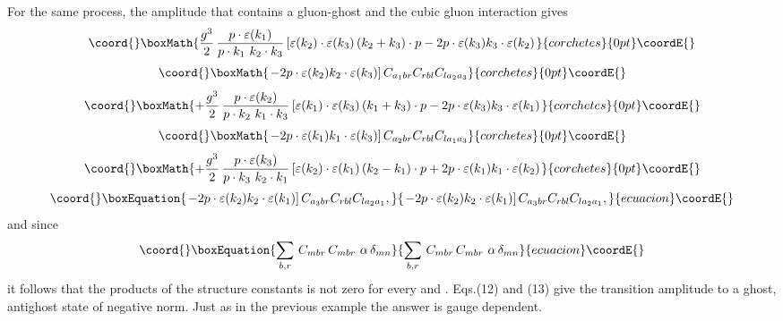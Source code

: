 \documentclass[a4paper,12pt]{article}
\begin{document}
For the same process, the amplitude that contains a gluon-ghost and the cubic gluon interaction gives
\begin{displaymath}\coord{}\boxMath{
\frac{g^{3}}{2} \, \frac{p \cdot \varepsilon(k_{1})}{p \cdot k_{1} \,\, k_{2} \cdot k_{3}} \left[ \varepsilon(k_{2}) \cdot \varepsilon(k_{3}) \, (k_{2} + k_{3}) \cdot p - 2 p \cdot \varepsilon(k_{3}) k_{3} \cdot \varepsilon (k_{2})
\right .
}{corchetes}{0pt}\coordE{}\end{displaymath}
\begin{displaymath}\coord{}\boxMath{
\left .
- 2p \cdot \varepsilon(k_{2}) k_{2} \cdot \varepsilon(k_{3}) \right] C_{a_{1}br} C_{rbl} C_{la_{2}a_{3}}
}{corchetes}{0pt}\coordE{}\end{displaymath}
\begin{displaymath}\coord{}\boxMath{
+ \frac{g^{3}}{2} \, \frac{p \cdot \varepsilon(k_{2})}{p \cdot k_{2} \,\, k_{1} \cdot k_{3}} \left[ \varepsilon(k_{1}) \cdot \varepsilon(k_{3}) \, (k_{1} + k_{3}) \cdot p - 2 p \cdot \varepsilon(k_{3}) k_{3} \cdot \varepsilon (k_{1})
\right .
}{corchetes}{0pt}\coordE{}\end{displaymath}
\begin{displaymath}\coord{}\boxMath{
\left .
- 2p \cdot \varepsilon(k_{1}) k_{1} \cdot \varepsilon(k_{3}) \right] C_{a_{2}br} C_{rbl} C_{la_{1}a_{3}}
}{corchetes}{0pt}\coordE{}\end{displaymath}
\begin{displaymath}\coord{}\boxMath{
+ \frac{g^{3}}{2} \, \frac{p \cdot \varepsilon(k_{3})}{p \cdot k_{3} \,\, k_{2} \cdot k_{1}} \left[ \varepsilon(k_{2}) \cdot \varepsilon(k_{1}) \, (k_{2} - k_{1}) \cdot p + 2 p \cdot \varepsilon(k_{1}) k_{1} \cdot \varepsilon (k_{2})
\right .
}{corchetes}{0pt}\coordE{}\end{displaymath}
\begin{equation}\coord{}\boxEquation{
\left .
- 2p \cdot \varepsilon(k_{2}) k_{2} \cdot \varepsilon(k_{1}) \right] C_{a_{3}br} C_{rbl} C_{la_{2}a_{1}},
}{
\left .
- 2p \cdot \varepsilon(k_{2}) k_{2} \cdot \varepsilon(k_{1}) \right] C_{a_{3}br} C_{rbl} C_{la_{2}a_{1}},
}{ecuacion}\coordE{}\end{equation}
and since
\begin{equation}\coord{}\boxEquation{
\sum_{b,r} \, C_{mbr} \, C_{mbr} \, \, \alpha \, \delta_{mn}
}{
\sum_{b,r} \, C_{mbr} \, C_{mbr} \, \, \alpha \, \delta_{mn}
}{ecuacion}\coordE{}\end{equation}
it follows that the products of the structure constants is not zero for every \coordHE{} and \coordHE{}.  Eqs.(12) and (13) give the transition amplitude to a ghost, antighost state of negative norm.  Just as in the previous example the answer is gauge dependent.
\end{document}
